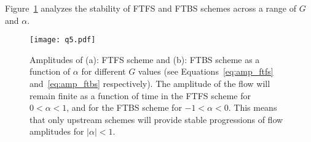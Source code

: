 \documentclass{article}
\begin{document}
\begin{homeworkProblem}
    
    Figure~\ref{fig:stability} analyzes the stability of FTFS and FTBS schemes
    across a range of $G$ and $\alpha$. 

    \begin{figure}[!ht]
    \begin{center}
        \texttt{[image: q5.pdf]} %

        \caption{\label{fig:stability} Amplitudes of (a): FTFS scheme and (b):
        FTBS scheme as a function of $\alpha$ for different $G$ values (see
        Equations~\ref{eq:amp_ftfs} and~\ref{eq:amp_ftbs} respectively). The
        amplitude of the flow will remain finite as a function of time in the
        FTFS scheme for $0 < \alpha < 1$, and for the FTBS scheme for $-1 <
        \alpha < 0$. This means that only upstream schemes will provide stable
        progressions of flow amplitudes for $|\alpha| < 1$.}

    \end{center}
    \end{figure}

\end{homeworkProblem}
\clearpage
\end{document}
